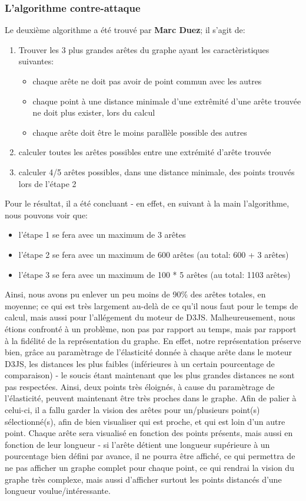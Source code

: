 \documentclass{report}
\begin{document}
\subsubsection{L'algorithme contre-attaque}
Le deuxième algorithme a été trouvé par \textbf{Marc Duez}; il s'agit de:
\begin{enumerate}
\item Trouver les 3 plus grandes arêtes du graphe ayant les caractèristiques suivantes:
	\begin{itemize}
	\item chaque arête ne doit pas avoir de point commun avec les autres
	\item chaque point à une distance minimale d'une extrêmité d'une arête trouvée ne doit plus exister, lors du calcul
	\item chaque arête doit être le moins parallèle possible des autres
	\end{itemize}
\item calculer toutes les arêtes possibles entre une extrémité d'arête trouvée
\item calculer 4/5 arêtes possibles, dans une distance minimale, des points trouvés lors de l'étape 2
\end{enumerate}
Pour le résultat, il a été concluant - en effet, en suivant à la main l'algorithme, nous pouvons voir que:
\begin{itemize}
\item l'étape 1 se fera avec un maximum de 3 arêtes
\item l'étape 2 se fera avec un maximum de 600 arêtes (au total: 600 + 3 arêtes)
\item l'étape 3 se fera avec un maximum de 100 * 5 arêtes (au total: 1103 arêtes)
\end{itemize}
Ainsi, nous avons pu enlever un peu moins de 90\% des arêtes totales, en moyenne; ce qui est très largement au-delà de ce qu'il nous faut pour le temps de calcul, mais aussi pour l'allégement du moteur de D3JS.
\newline
Malheureusement, nous étions confronté à un problème, non pas par rapport au temps, mais par rapport à la fidélité de la représentation du graphe.
\newline
En effet, notre représentation préserve bien, grâce au paramètrage de l'élasticité donnée à chaque arête dans le moteur D3JS, les distances les plus faibles (inférieures à un certain pourcentage de comparaison) - le soucis étant maintenant que les plus grandes distances ne sont pas respectées. Ainsi, deux points très éloignés, à cause du paramètrage de l'élasticité, peuvent maintenant être très proches dans le graphe.
\newline
Afin de palier à celui-ci, il a fallu garder la vision des arêtes pour un/plusieurs point(s) sélectionné(s), afin de bien visualiser qui est proche, et qui est loin d'un autre point. Chaque arête sera visualisé en fonction des points présents, mais aussi en fonction de leur longueur - si l'arête détient une longueur supérieure à un pourcentage bien défini par avance, il ne pourra être affiché, ce qui permettra de ne pas afficher un graphe complet pour chaque point, ce qui rendrai la vision du graphe très complexe, mais aussi d'afficher surtout les points distancés d'une longueur voulue/intéressante.
\end{document}
